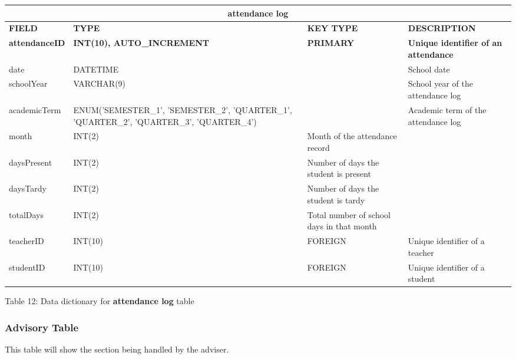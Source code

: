 \documentclass[11pt,a4paper,titlepage]{article}
\begin{document}
\vspace{1cm}
\begin{longtable}{ |p{2.5cm}|p{4.5cm}|p{2.5cm}|p{3cm}|  }
    \hline
    \multicolumn{4}{|c|}{\textbf{attendance log}} \\
    \hline
    \textbf{FIELD}&\textbf{TYPE}&\textbf{KEY TYPE}&\textbf{DESCRIPTION}\\
    \hline
    \textbf{attendanceID}  & \textbf{INT(10), AUTO\_INCREMENT} & \textbf{PRIMARY} & \textbf{Unique identifier of an attendance}\\ \hline
    date   & DATETIME   & & School date\\ \hline
    schoolYear   & VARCHAR(9)   & & School year of the attendance log\\ \hline
    academicTerm   & ENUM('SEMESTER\_1', 'SEMESTER\_2', 'QUARTER\_1', 'QUARTER\_2', 'QUARTER\_3', 'QUARTER\_4') &  & Academic term of the attendance log\\ \hline
    month   & INT(2)   & Month of the attendance record\\ \hline
    daysPresent   & INT(2)   & Number of days the student is present\\ \hline
    daysTardy   & INT(2)   & Number of days the student is tardy\\ \hline
    totalDays   & INT(2)   & Total number of school days in that month\\ \hline
    teacherID   & INT(10)   & FOREIGN & Unique identifier of a teacher\\ \hline
    studentID   & INT(10)   & FOREIGN & Unique identifier of a student\\ \hline
\end{longtable}

\vspace{.5cm}
\begin{center}
    Table 12: Data dictionary for \textbf{attendance log} table
\end{center}

\newpage

\subsubsection{Advisory Table}

This table will show the section being handled by the adviser.
\end{document}
